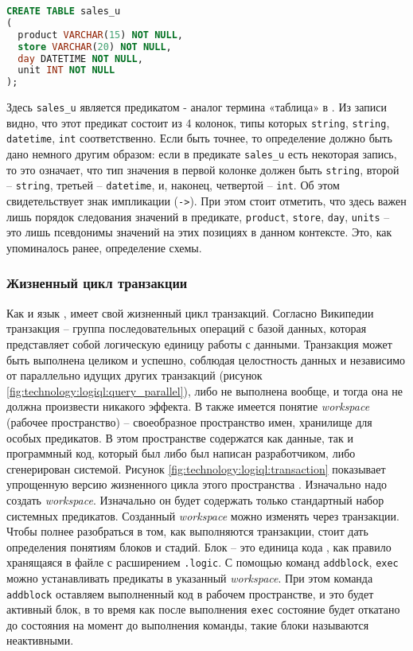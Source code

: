 \begin{lstlisting}[language=SQL]
CREATE TABLE sales_u
(
  product VARCHAR(15) NOT NULL,
  store VARCHAR(20) NOT NULL,
  day DATETIME NOT NULL,
  unit INT NOT NULL
);
\end{lstlisting}

Здесь \lstinline{sales_u} является предикатом - аналог термина «таблица» в
\sql. Из записи видно, что этот предикат состоит из 4 колонок, типы которых \lstinline{string}, \lstinline{string}, \lstinline{datetime}, \lstinline{int} соответственно. Если быть точнее, то определение должно быть дано немного другим образом: если в предикате \lstinline{sales_u} есть некоторая запись, то это означает, что тип значения в первой колонке должен быть \lstinline{string}, второй – \lstinline{string}, третьей – \lstinline{datetime}, и, наконец, четвертой – \lstinline{int}. Об этом свидетельствует знак импликации (\lstinline{->}). При этом стоит отметить, что здесь важен лишь порядок следования значений в предикате, \lstinline{product}, \lstinline{store}, \lstinline{day}, \lstinline{units} – это лишь псевдонимы значений на этих позициях в данном контексте. Это, как упоминалось ранее, определение схемы.

\subsubsection{Жизненный цикл транзакции}
\label{sec:technology:logiql:transaction}

Как и язык \sql, \logiql имеет свой жизненный цикл транзакций. Согласно Википедии \cite{transaction_definition} транзакция – группа последовательных операций с базой данных, которая представляет собой логическую единицу работы с данными. Транзакция может быть выполнена целиком и успешно, соблюдая целостность данных и независимо от параллельно идущих других транзакций (рисунок \ref{fig:technology:logiql:query_parallel}), либо не выполнена вообще, и тогда она не должна произвести никакого эффекта.
В \logiql также имеется понятие \emph{workspace} (рабочее пространство) – своеобразное пространство имен, хранилище для особых предикатов. В этом пространстве содержатся как данные, так и программный код, который был либо был написан разработчиком, либо сгенерирован системой. Рисунок \ref{fig:technology:logiql:transaction} показывает упрощенную версию жизненного цикла этого пространства \cite{query_language_for_smart_db}.
Изначально надо создать \emph{workspace}. Изначально он будет содержать только стандартный набор системных предикатов. Созданный \emph{workspace} можно изменять через транзакции.
Чтобы полнее разобраться в том, как выполняются транзакции, стоит дать определения понятиям блоков и стадий. Блок – это единица кода \logiql, как правило хранящаяся в файле с расширением \lstinline{.logic}. С помощью команд \lstinline{addblock}, \lstinline{exec} можно устанавливать предикаты в указанный \emph{workspace}. При этом команда \lstinline{addblock} оставляем выполненный код в рабочем пространстве, и это будет активный блок, в то время как после выполнения \lstinline{exec} состояние будет откатано до состояния на момент до выполнения команды, такие блоки называются неактивными.

